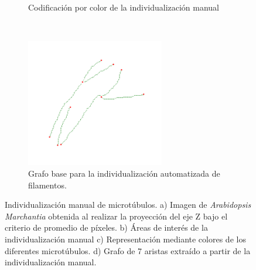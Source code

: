 \begin{figure}[h!]
\begin{subfigure}[t]{0.49\textwidth}
        \caption{Codificaci\'on por color de la individualizaci\'on manual}
        \label{fig:field3t0filtered2-indivManual}
    \end{subfigure}
    ~
    \begin{subfigure}[t]{0.49\textwidth}
        \centering
        \includegraphics[height=2.2in]{benchImages/field3-t0-2cellBcrop-filtered-2-graph-thick.png}
        \caption{Grafo base para la individualizaci\'on automatizada de filamentos.}
        \label{fig:field3t0filtered2-graph}
    \end{subfigure}
    \caption{Individualizaci\'on manual de microt\'ubulos. a) Imagen de {\it Arabidopsis Marchantia} obtenida al realizar la proyecci\'on del eje Z bajo el criterio de promedio de p\'ixeles. b) \'Areas de inter\'es de la individualizaci\'on manual c) Representaci\'on mediante colores de los diferentes microt\'ubulos. d) Grafo de 7 aristas extra\'ido a partir de la individualizaci\'on manual.}
    \label{fig:field3t0filtered2}
\end{figure}

